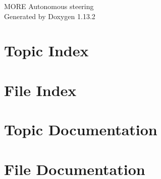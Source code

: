\documentclass[twoside]{book}
\newcommand{\+}{\discretionary{\mbox{\scriptsize$\hookleftarrow$}}{}{}}
\newcommand{\clearemptydoublepage}{%
    \newpage{\pagestyle{empty}\cleardoublepage}%
  }
\begin{document}
  \raggedbottom
    \hypersetup{pageanchor=false,
                bookmarksnumbered=true,
                pdfencoding=unicode
               }
  \begin{titlepage}
  \vspace*{7cm}
  \begin{center}%
  {\Large MORE Autonomous steering}\\
  \vspace*{1cm}
  {\large Generated by Doxygen 1.13.2}\\
  \end{center}
  \end{titlepage}
  \clearemptydoublepage
  \tableofcontents
  \clearemptydoublepage
  \hypersetup{pageanchor=true}
\chapter{Topic Index}

\chapter{File Index}

\chapter{Topic Documentation}


\chapter{File Documentation}



















  \backmatter
  \newpage
  \clearemptydoublepage
  \printindex
\end{document}
